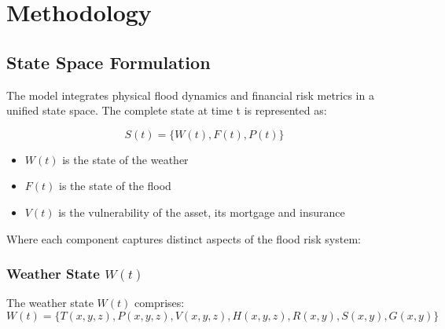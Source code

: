 \documentclass{article}
\begin{document}
\section{Methodology}

\subsection{State Space Formulation}
The model integrates physical flood dynamics and financial risk metrics in a unified state space. The complete state at time t is represented as:

\begin{equation}
S(t) = \{W(t), F(t), P(t)\}
\end{equation}
\begin{itemize}
	\item $W(t)$ is the state of the weather
	\item $F(t)$ is the state of the flood
	\item $V(t)$ is the vulnerability of the asset,  its mortgage and insurance
\end{itemize}

Where each component captures distinct aspects of the flood risk system:

\subsubsection{Weather State $W(t)$}
The weather state $W(t)$ comprises:
\begin{equation}
W(t) = \{T(x,y,z), P(x,y,z), V(x,y,z), H(x,y,z), R(x,y), S(x,y), G(x,y)\}
\end{equation}
\end{document}
